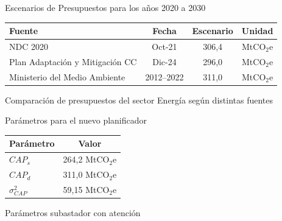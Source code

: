 \documentclass[xcolor=dvipsnames]{beamer}
\begin{document}
\begin{frame}{Escenarios de Presupuestos para los años 2020 a 2030}
    \centering
    \small
    \renewcommand{\arraystretch}{1.15}
    \begin{tabular}{l c c c}
        \hline
        \textbf{Fuente} & \textbf{Fecha} & \textbf{Escenario} & \textbf{Unidad} \\
        \hline
        NDC 2020 & Oct-21 & 306,4 & MtCO$_2$e \\
        Plan Adaptación y Mitigación CC & Dic-24 & 296,0 & MtCO$_2$e \\
        Ministerio del Medio Ambiente & 2012--2022 & 311,0 & MtCO$_2$e \\
        \hline
    \end{tabular}

    \vspace{0.3cm}
    \footnotesize{Comparación de presupuestos del sector Energía según distintas fuentes}
\end{frame}

\begin{frame}{Parámetros para el nuevo planificador}
    \centering
    \small
    \renewcommand{\arraystretch}{1.2}

    \begin{tabular}{l c}
        \hline
        \textbf{Parámetro} & \textbf{Valor} \\
        \hline
        $CAP_s$            & 264,2 MtCO$_2$e \\
        $CAP_d$            & 311,0 MtCO$_2$e\\
        $\sigma_{CAP}^2$   & 59,15  MtCO$_2$e\\
        \hline
    \end{tabular}

    \vspace{0.3cm}
    \footnotesize{Parámetros subastador con atención}
\end{frame}
\end{document}
